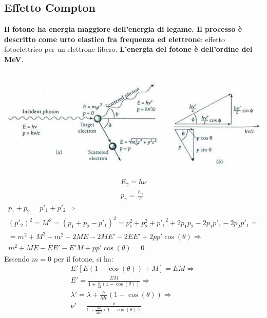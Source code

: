 \documentclass[a4paper,11pt,twoside,openany]{book}
\theoremstyle{definition}
\theoremstyle{plain}
\theoremstyle{plain}
\theoremstyle{definition}
\begin{document}
\subsection{Effetto Compton} %
\textbf{Il fotone ha energia maggiore dell'energia di legame. Il processo è descritto come urto elastico fra frequenza ed elettrone}: effetto fotoelettrico per un elettrone libero. \textbf{L'energia del fotone è dell'ordine del MeV}.

\begin{center}
\includegraphics[width=\textwidth]{immagini/compton.jpg} %
\end{center}

\begin{equation}\begin{split}
E_{\gamma}=h\nu\\
p_{\gamma}=\frac{E_{\gamma}}{c}
\end{split}\end{equation}
\begin{equation}\begin{split}
p_1+p_2=p'_1+p'_2 \Longrightarrow \\
\left(p'_2\right)^2=M^2=\left(p_1+p_2-p'_1\right)^2=p_1^2+p_2^2+{p'_1}^2+2p_1p_2-2p_1p'_1-2p_2p'_1=\\
=m^2+M^2+m^2+2ME-2ME'-2EE'+2pp'\cos{\left(\theta\right)} \Longrightarrow \\
m^2+ME-EE'-E'M+pp'\cos{\left(\theta\right)}=0
\end{split}\end{equation}
Essendo $m=0$ per il fotone, si ha:
\begin{equation}\begin{split}
E' \left[E\left(1-\cos{\left(\theta \right)}\right)+M\right]=EM \Longrightarrow \\
E' =\frac{EM}{1+\frac{E}{M}\left(1-\cos{\left(\theta \right)}\right)} \Longrightarrow \\
\lambda'=\lambda+\frac{h}{Mc}\left(1-\cos{\left(\theta \right)}\right) \Longrightarrow \\
\nu'=\frac{\nu}{1+\frac{h\nu}{Mc^2}\left(1-\cos{\left(\theta\right)}\right)}
\end{split}\end{equation}
\end{document}
